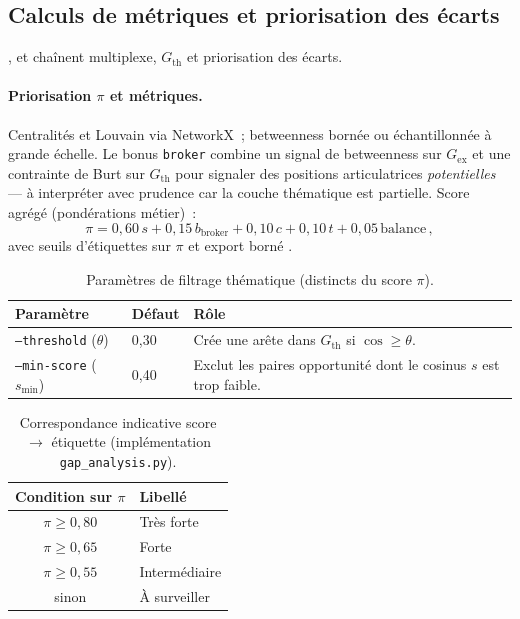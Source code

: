 \documentclass[12pt,a4paper,oneside]{article}
\begin{document}
\subsection{Calculs de métriques et priorisation des écarts}\label{sec:opportunites}
,  et  chaînent multiplexe, $G_{\mathrm{th}}$ et priorisation des écarts.
\paragraph{Priorisation $\pi$ et métriques.}
Centralités et Louvain via NetworkX~; betweenness bornée ou échantillonnée à grande échelle. Le bonus \texttt{broker} combine un signal de betweenness sur $G_{\mathrm{ex}}$ et une contrainte de Burt sur $G_{\mathrm{th}}$ pour signaler des positions articulatrices \emph{potentielles} — à interpréter avec prudence car la couche thématique est partielle. Score agrégé (pondérations métier)~:
\begin{equation}
\label{eq:prio-gap}
\pi = 0{,}60\, s + 0{,}15\, b_{\mathrm{broker}} + 0{,}10\, c + 0{,}10\, t + 0{,}05\, \mathrm{balance}\,,
\end{equation}
avec seuils d'étiquettes sur $\pi$ et export borné .

\begin{table}[htbp]
\centering
\small
\caption{Paramètres de filtrage thématique (distincts du score $\pi$).}
\label{tab:filtres-theme}
\begin{tabular}{@{}llp{6.2cm}@{}}
\toprule
\textbf{Paramètre} & \textbf{Défaut} & \textbf{Rôle} \\
\midrule
\texttt{--threshold} ($\theta$) & 0,30 & Crée une arête dans $G_{\mathrm{th}}$ si $\cos\geq\theta$. \\
\texttt{--min-score} ($s_{\min}$) & 0,40 & Exclut les paires opportunité dont le cosinus $s$ est trop faible. \\
\bottomrule
\end{tabular}
\end{table}

\begin{table}[htbp]
\centering
\small
\caption{Correspondance indicative score $\rightarrow$ étiquette (implémentation \texttt{gap\_analysis.py}).}
\label{tab:seuils-pi}
\begin{tabular}{@{}c l@{}}
\toprule
\textbf{Condition sur $\pi$} & \textbf{Libellé} \\
\midrule
$\pi \ge 0{,}80$ & Très forte \\
$\pi \ge 0{,}65$ & Forte \\
$\pi \ge 0{,}55$ & Intermédiaire \\
sinon & À surveiller \\
\bottomrule
\end{tabular}
\end{table}
\end{document}
